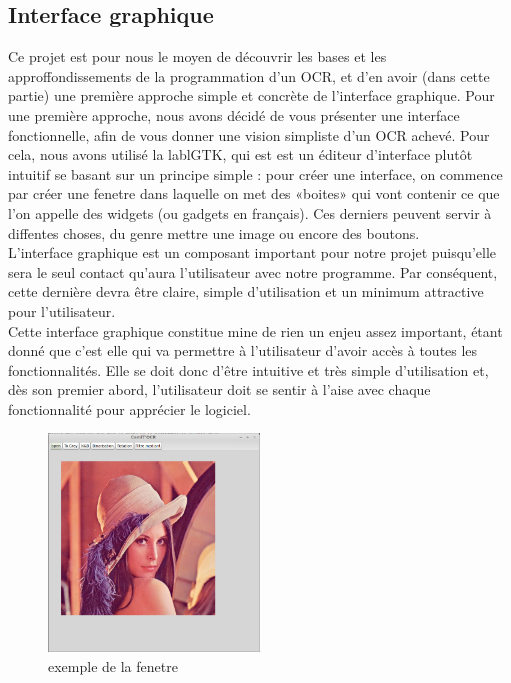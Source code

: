 \documentclass[12pt]{article}
\begin{document}
\subsection{Interface graphique}
Ce projet est pour nous le moyen de découvrir les bases et les approffondissements de la programmation d’un OCR, et d’en avoir (dans cette partie) une première approche simple et concrète de l’interface graphique. Pour une première approche, nous avons décidé de vous présenter une interface fonctionnelle, afin de vous donner une vision simpliste d’un OCR achevé. Pour cela, nous avons utilisé la lablGTK, qui est est un éditeur d’interface plutôt intuitif se basant sur un principe simple : pour créer une interface, on commence par créer une fenetre dans laquelle on met des «boites» qui vont contenir ce que l’on appelle des widgets (ou gadgets en français). Ces derniers peuvent servir à diffentes choses, du genre mettre une image ou encore des boutons.\\
L’interface graphique est un composant important pour notre projet puisqu’elle sera le seul contact qu’aura l’utilisateur avec notre programme. Par conséquent, cette dernière  devra être claire, simple d’utilisation et un minimum attractive pour l’utilisateur.\\
Cette interface graphique constitue mine de rien un enjeu assez important, étant
donné que c’est elle qui va permettre à l’utilisateur d’avoir accès à toutes les fonctionnalités. Elle se doit donc d’être intuitive et très simple d’utilisation et, dès son premier abord, l’utilisateur doit se sentir à l’aise avec chaque fonctionnalité pour apprécier le logiciel.
\begin{figure}[h]
\begin{center}
\includegraphics[width=0.50\textwidth]{img/gui.png}
\caption{exemple de la fenetre}
\end{center}
\end{figure}
\end{document}
